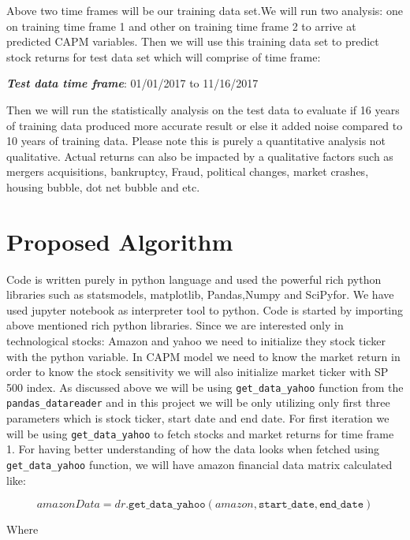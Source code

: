 \indent
Above two time frames will be our training data set.We will run two analysis: one on training time frame 1 and other on training time frame 2 to arrive at predicted
CAPM variables. Then we will use this training data set to predict stock returns for test data set which will comprise of time frame:

\begin{algorithm}
\textbf{\textit{Test data time frame}}: 01/01/2017 to 11/16/2017\newline
\end{algorithm}

Then we will run the statistically analysis on the test data to evaluate if 16 years of training data produced more accurate result or else it added noise compared
to 10 years of training data. Please note this is purely a quantitative analysis not qualitative. Actual returns can also be impacted by a qualitative factors
such as mergers acquisitions, bankruptcy, Fraud, political changes, market crashes, housing bubble, dot net bubble and etc.  

\section{Proposed Algorithm}

Code is written purely in python language and used the powerful rich python libraries such as statsmodels, matplotlib, Pandas,Numpy and SciPyfor. 
We have used jupyter notebook as interpreter tool to python. Code is started by importing above mentioned rich python libraries. Since we are interested 
only in technological stocks: Amazon and yahoo we need to initialize they stock ticker with the python variable. In CAPM model we need to know the market
return in order to know the stock sensitivity we will also initialize market ticker with SP 500 index. As discussed above we will be using \texttt{get\_data\_yahoo} 
function from the \texttt{pandas\_datareader} and in this project we will be only utilizing only first three parameters which is stock ticker, start date and 
end date. For first iteration we will be using \texttt{get\_data\_yahoo}  to fetch stocks and market returns for time frame 1. For having better understanding 
of how the data looks when fetched using \texttt{get\_data\_yahoo}  function, we will have amazon financial data matrix calculated like:

$$amazonData = dr.\texttt{get\_data\_yahoo}(amazon,\texttt{start\_date},\texttt{end\_date})$$

\indent
Where 
\indent


